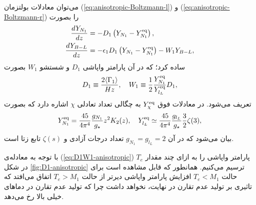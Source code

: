 \documentclass[a4paper]{book}
\begin{document}
می‌توان معادلات بولتزمان (\ref{eq:anisotropic-Boltzmann-l}) و (\ref{eq:anisotropic-Boltzmann-r}) را بصورت
{\footnotesize\begin{align}
	\frac{dY_{N_1}}{dz} &= -D_1 \left( Y_{N_1} - Y_{N_1}^{{\rm eq}} \right),\\
	\frac{dY_{B-L}}{dz} &= - \epsilon_1 D_1 \left( Y_{N_1} - Y_{N_1}^{{\rm eq}} \right) - W_1 Y_{B-L},
\end{align}}
ساده کرد؛ که در آن پارامتر واپاشی {\footnotesize$D_1$} و شستشو {$W_1$} بصورت
{\footnotesize\begin{align}
	D_1 \equiv  \frac{2 \langle \Gamma_{1} \rangle}{H z}, \quad
	W_1 \equiv \frac{1}{2} \frac{Y_{N_1}^{{\rm eq}}}{Y_{{l_L}}^{{\rm eq}}} D_1,
	\label{eq:D1W1-anisotropic}
\end{align}}
تعریف می‌شود. در معادلات فوق {\footnotesize$Y_{\chi}^{{\rm eq}}$} به چگالی تعداد تعادلی {\footnotesize$\chi$} اشاره دارد که بصورت
{\footnotesize\begin{align}
	Y_{N_1}^{{\rm eq}} = \frac{45}{4 \pi^4} \frac{g_{N_1}}{g_{\star}} z^2 K_2(z), \quad 
	Y_{{l_L}}^{{\rm eq}} \simeq \frac{45}{4 \pi^4} \frac{g_{{l_L}}}{g_{\star}} \frac{3}{2} \zeta(3),
	\label{eq:YEq-anisotropic}
\end{align}}
بیان می‌شود که در آن {\footnotesize$g_{N_1}=g_{{l_L}}=2$} تعداد درجات آزادی و {\footnotesize$\zeta(s)$} تابع زتا است.

با توجه به معادله‌ی (\ref{eq:D1W1-anisotropic}) پارامتر واپاشی را به ازای چند مقدار {\footnotesize$T_e$} در شکل \ref{fig:D1-anisotropic} ترسیم می‌کنیم. همانطور که قابل مشاهده است برای حالت {\footnotesize$T_e<M_1$} افزایش پارامتر واپاشی دیرتر از حالت {\footnotesize$T_e>M_1$} اتفاق می‌افتد که تاثیری بر تولید عدم تقارن در نهایت، نخواهد داشت چرا که تولید عدم تقارن در دماهای خیلی بالا رخ می‌دهد.
\end{document}
